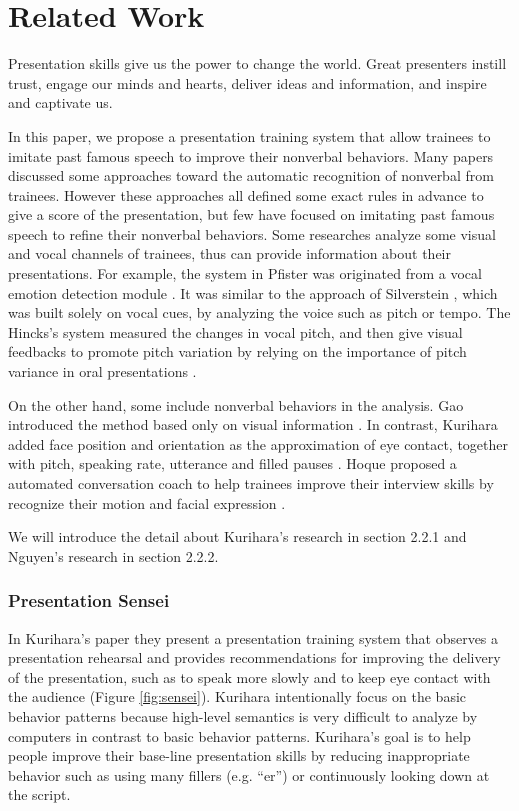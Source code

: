 \chapter[Related Work]{Related Work}
\par Presentation skills give us the power to change the world. Great presenters instill trust, engage our minds and hearts, deliver ideas and information, and inspire and captivate us.

\par In this paper, we propose a presentation training system that allow trainees to imitate past famous speech to improve their nonverbal behaviors. Many papers discussed some approaches toward the automatic recognition of nonverbal from trainees. However these approaches all defined some exact rules in advance to give a score of the presentation, but few have focused on imitating past famous speech to refine their nonverbal behaviors. Some researches analyze some visual and vocal channels of trainees, thus can provide information about their presentations. For example, the system in Pfister was originated from a vocal emotion detection module \cite{pfister2011real}. It was similar to the approach of Silverstein \cite{Silverstein2006}, which was built solely on vocal cues, by analyzing the voice such as pitch or tempo. The Hincks's system measured the changes in vocal pitch, and then give visual feedbacks to promote pitch variation by relying on the importance of pitch variance in oral presentations \cite{hincks2009promoting}.
\par On the other hand, some include nonverbal behaviors in the analysis. Gao introduced the method based only on visual information \cite{Gao}. In contrast, Kurihara added face position and orientation as the approximation of eye contact, together with pitch, speaking rate, utterance and filled pauses \cite{Kurihara2007}. Hoque proposed a automated conversation coach to help trainees improve their interview skills by recognize their motion and facial expression \cite{Kurihara2007}.
\par We will introduce the detail about Kurihara's research \cite{Kurihara2007} in section 2.2.1 and Nguyen's research \cite{nguyen2015intelligent} in section 2.2.2. 

\subsection{Presentation Sensei}
\par In Kurihara's paper they present a presentation training system that observes a presentation rehearsal and provides recommendations for improving the delivery of the presentation, such as to speak more slowly and to keep eye contact with the audience (Figure \ref{fig:sensei}). Kurihara intentionally focus on the basic behavior patterns because high-level semantics is very difficult to analyze by computers in contrast to basic behavior patterns. Kurihara's goal is to help people improve their base-line presentation skills by reducing inappropriate behavior such as using many fillers (e.g. “er”) or continuously looking down at the script.

